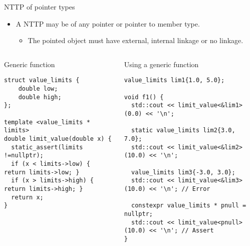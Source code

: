 \begin{frame}[t,fragile]{NTTP of pointer types}
\begin{itemize}
  \item A NTTP may be of any pointer or pointer to member type.
    \begin{itemize}
      \item The pointed object must have external, internal linkage or no linkage.
    \end{itemize}
\end{itemize}

\begin{columns}[T]

\begin{block}{Generic function}
\begin{lstlisting}
struct value_limits {
    double low;
    double high;
};

template <value_limits * limits>
double limit_value(double x) {
  static_assert(limits !=nullptr);
  if (x < limits->low) { return limits->low; }
  if (x > limits->high) { return limits->high; }
  return x;
}
\end{lstlisting}
\end{block}

\pause
{}
\begin{block}{Using a generic function}
\begin{lstlisting}[basicstyle=\mode<presentation>{\tiny}]
value_limits lim1{1.0, 5.0};

void f1() {
  std::cout << limit_value<&lim1>(0.0) << '\n';

  static value_limits lim2{3.0, 7.0};
  std::cout << limit_value<&lim2>(10.0) << '\n';

  value_limits lim3{-3.0, 3.0};
  std::cout << limit_value<&lim3>(10.0) << '\n'; // Error

  constexpr value_limits * pnull = nullptr;
  std::cout << limit_value<pnull>(10.0) << '\n'; // Assert
}

\end{lstlisting}
\end{block}

\end{columns}
\end{frame}

